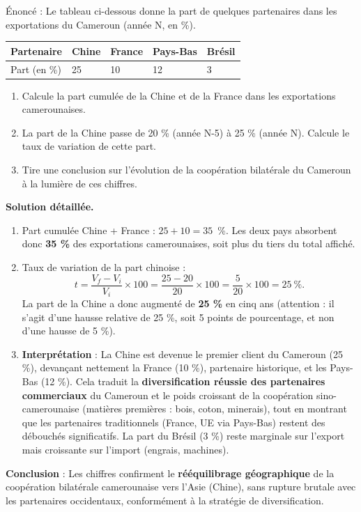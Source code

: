 \documentclass[11pt]{article}
\begin{document}
\begin{exoresolu}
Énoncé : Le tableau ci-dessous donne la part de quelques partenaires dans les exportations du Cameroun (année N, en \%).
\begin{center}
\begin{tabularx}{\linewidth}{|l|X|X|X|X|}
\hline
\rowcolor{popblueL} Partenaire & Chine & France & Pays-Bas & Brésil \\
\hline
Part (en \%) & 25 & 10 & 12 & 3 \\
\hline
\end{tabularx}
\end{center}
\begin{enumerate}
\item Calcule la part cumulée de la Chine et de la France dans les exportations camerounaises.
\item La part de la Chine passe de 20 \% (année N-5) à 25 \% (année N). Calcule le taux de variation de cette part.
\item Tire une conclusion sur l'évolution de la coopération bilatérale du Cameroun à la lumière de ces chiffres.
\end{enumerate}
\tcblower
\textbf{Solution détaillée.}
\begin{enumerate}
\item Part cumulée Chine + France : $25 + 10 = 35$~\%. Les deux pays absorbent donc \textbf{35 \%} des exportations camerounaises, soit plus du tiers du total affiché.
\item Taux de variation de la part chinoise :
\[ t = \dfrac{V_f - V_i}{V_i} \times 100 = \dfrac{25 - 20}{20} \times 100 = \dfrac{5}{20} \times 100 = 25~\%. \]
La part de la Chine a donc augmenté de \textbf{25 \%} en cinq ans (attention : il s'agit d'une hausse relative de 25 \%, soit 5 points de pourcentage, et non d'une hausse de 5 \%).
\item \textbf{Interprétation} : La Chine est devenue le premier client du Cameroun (25 \%), devançant nettement la France (10 \%), partenaire historique, et les Pays-Bas (12 \%). Cela traduit la \textbf{diversification réussie des partenaires commerciaux} du Cameroun et le poids croissant de la coopération sino-camerounaise (matières premières : bois, coton, minerais), tout en montrant que les partenaires traditionnels (France, UE via Pays-Bas) restent des débouchés significatifs. La part du Brésil (3 \%) reste marginale sur l'export mais croissante sur l'import (engrais, machines).
\end{enumerate}
\textbf{Conclusion} : Les chiffres confirment le \textbf{rééquilibrage géographique} de la coopération bilatérale camerounaise vers l'Asie (Chine), sans rupture brutale avec les partenaires occidentaux, conformément à la stratégie de diversification.
\end{exoresolu}
\end{document}
